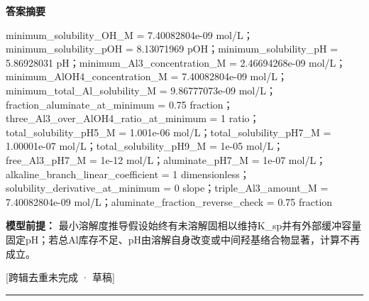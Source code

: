 \documentclass[UTF8,11pt,a4paper]{ctexart}
\begin{document}
\noindent\textbf{答案摘要}\par
minimum\_solubility\_OH\_M = 7.40082804e-09 mol/L；minimum\_solubility\_pOH = 8.13071969 pOH；minimum\_solubility\_pH = 5.86928031 pH；minimum\_Al3\_concentration\_M = 2.46694268e-09 mol/L；minimum\_AlOH4\_concentration\_M = 7.40082804e-09 mol/L；minimum\_total\_Al\_solubility\_M = 9.86777073e-09 mol/L；fraction\_aluminate\_at\_minimum = 0.75 fraction；three\_Al3\_over\_AlOH4\_ratio\_at\_minimum = 1 ratio；total\_solubility\_pH5\_M = 1.001e-06 mol/L；total\_solubility\_pH7\_M = 1.00001e-07 mol/L；total\_solubility\_pH9\_M = 1e-05 mol/L；free\_Al3\_pH7\_M = 1e-12 mol/L；aluminate\_pH7\_M = 1e-07 mol/L；alkaline\_branch\_linear\_coefficient = 1 dimensionless；solubility\_derivative\_at\_minimum = 0 slope；triple\_Al3\_amount\_M = 7.40082804e-09 mol/L；aluminate\_fraction\_reverse\_check = 0.75 fraction\par
\noindent\textbf{模型前提：}
最小溶解度推导假设始终有未溶解固相以维持K\_sp并有外部缓冲容量固定pH；若总Al库存不足、pH由溶解自身改变或中间羟基络合物显著，计算不再成立。\par
\noindent\textcolor{red!65!black}{[跨辑去重未完成 · 草稿]} \par
\medskip\hrule\medskip
{}
\end{document}
